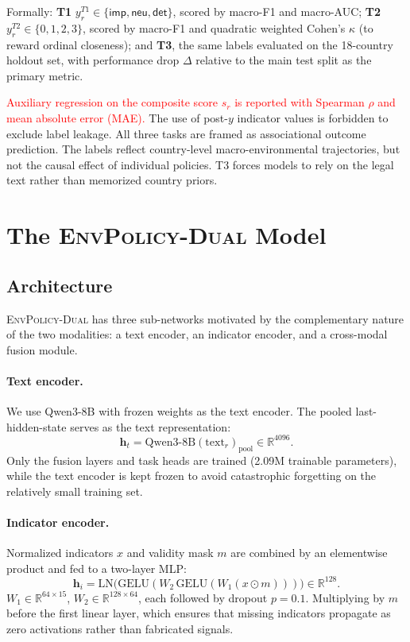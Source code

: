 \documentclass[11pt]{article}
\newcommand{\ours}{\textsc{EnvPolicy-Dual}}
\begin{document}
Formally: \textbf{T1} $y^{T1}_r\in\{\textsf{imp},\textsf{neu},\textsf{det}\}$, scored by macro-F1 and macro-AUC; \textbf{T2} $y^{T2}_r\in\{0,1,2,3\}$, scored by macro-F1 and quadratic weighted Cohen's $\kappa$ (to reward ordinal closeness); and \textbf{T3}, the same labels evaluated on the 18-country holdout set, with performance drop $\Delta$ relative to the main test split as the primary metric.

\textcolor{red}{Auxiliary regression on the composite score $s_r$ is reported with Spearman $\rho$ and mean absolute error (MAE).} The use of post-$y$ indicator values is forbidden to exclude label leakage. All three tasks are framed as associational outcome prediction. The labels reflect country-level macro-environmental trajectories, but not the causal effect of individual policies. T3 forces models to rely on the legal text rather than memorized country priors.


\section{The \ours{} Model}
\label{sec:model}

\subsection{Architecture}

\ours{} has three sub-networks motivated by the complementary nature of the two modalities: a text encoder, an indicator encoder, and a cross-modal fusion module.

\paragraph{Text encoder.}
We use Qwen3-8B \citep{qwen2025} with frozen weights as the text encoder. The pooled last-hidden-state serves as the text representation:
\begin{equation}
\mathbf{h}_t = \text{Qwen3-8B}(\text{text}_r)_{\text{pool}}\in\mathbb{R}^{4096}.
\end{equation}
Only the fusion layers and task heads are trained (2.09M trainable parameters), while the text encoder is kept frozen to avoid catastrophic forgetting on the relatively small training set.

\paragraph{Indicator encoder.}
Normalized indicators $x$ and validity mask $m$ are combined by an elementwise product and fed to a two-layer MLP:
\begin{equation}
\mathbf{h}_i = \text{LN}\!\bigl(\text{GELU}(W_2\,\text{GELU}(W_1(x\odot m)))\bigr)\in\mathbb{R}^{128}.
\end{equation}
$W_1\in\mathbb{R}^{64\times 15}$, $W_2\in\mathbb{R}^{128\times 64}$, each followed by dropout $p=0.1$. Multiplying by $m$ before the first linear layer, which ensures that missing indicators propagate as zero activations rather than fabricated signals.
\end{document}
